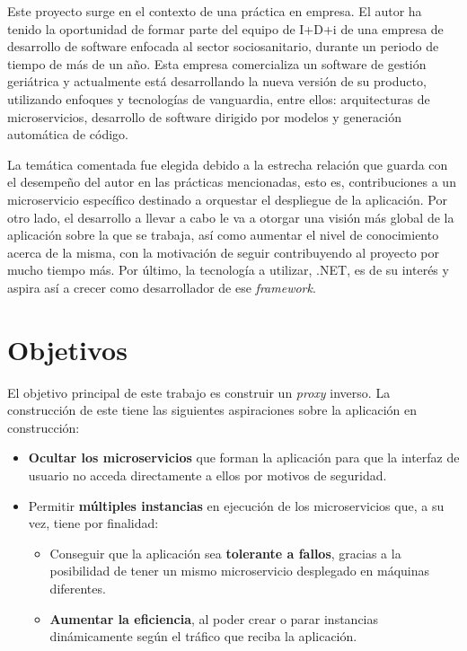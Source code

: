 \documentclass[11pt,spanish,listoffigures]{tfgetsinf}
\begin{document}
Este proyecto surge en el contexto de una práctica en empresa. El autor ha tenido la oportunidad de formar parte del equipo de I+D+i de una empresa de desarrollo de software enfocada al sector sociosanitario, durante un periodo de tiempo de más de un año. Esta empresa comercializa un software de gestión geriátrica y actualmente está desarrollando la nueva versión de su producto, utilizando enfoques y tecnologías de vanguardia, entre ellos: arquitecturas de microservicios, desarrollo de software dirigido por modelos y generación automática de código.

La temática comentada fue elegida debido a la estrecha relación que guarda con el desempeño del autor en las prácticas mencionadas, esto es, contribuciones a un microservicio específico destinado a orquestar el despliegue de la aplicación. Por otro lado, el desarrollo a llevar a cabo le va a otorgar una visión más global de la aplicación sobre la que se trabaja, así como aumentar el nivel de conocimiento acerca de la misma, con la motivación de seguir contribuyendo al proyecto por mucho tiempo más. Por último, la tecnología a utilizar, .NET, es de su interés y aspira así a crecer como desarrollador de ese \emph{framework}.


\section{Objetivos}

El objetivo principal de este trabajo es construir un \emph{proxy} inverso. La construcción de este tiene las siguientes aspiraciones sobre la aplicación en construcción:

\begin{itemize}

\item \textbf{Ocultar los microservicios} que forman la aplicación para que la interfaz de usuario no acceda directamente a ellos por motivos de seguridad.

\item Permitir \textbf{múltiples instancias} en ejecución de los microservicios que, a su vez, tiene por finalidad:
\begin{itemize}

\item Conseguir que la aplicación sea \textbf{tolerante a fallos}, gracias a la posibilidad de tener un mismo microservicio desplegado en máquinas diferentes.

\item \textbf{Aumentar la eficiencia}, al poder crear o parar instancias dinámicamente según el tráfico que reciba la aplicación.

\end{itemize}

\end{itemize}
\end{document}

